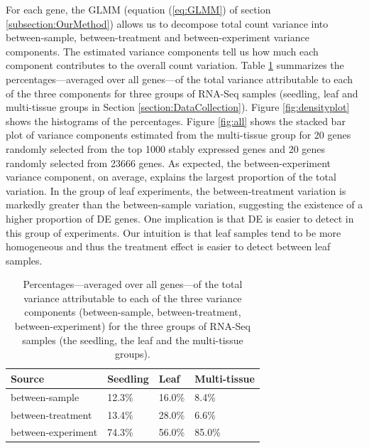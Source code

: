 \documentclass[letterpaper,12pt]{article}
\begin{document}
For each gene, the GLMM (equation (\ref{eq:GLMM}) of section
\ref{subsection:OurMethod}) allows us to decompose total count variance into
between-sample, between-treatment and between-experiment variance components.
The estimated variance components tell us how much each component contributes
to the overall count variation. Table \ref{table:percentageofvariation}
summarizes the percentages---averaged over all genes---of the total variance
attributable to each of the three components for three groups of RNA-Seq
samples (seedling, leaf and multi-tissue groups in Section \ref{section:DataCollection}). Figure \ref{fig:densityplot}
shows the histograms of the percentages. 
Figure \ref{fig:all} shows the stacked bar plot of variance components 
estimated from the multi-tissue group for 20
genes randomly selected from the top 1000 stably expressed genes 
and 20 genes randomly selected from 23666 genes. 
As expected, the between-experiment variance component, on average, explains
the largest proportion of the total variation. In the group of leaf
experiments, the between-treatment variation is markedly greater than the
between-sample variation, suggesting the existence of a higher proportion of DE genes.
One implication is that DE is easier to detect in
this group of experiments.  
Our intuition is that leaf samples tend
to be more homogeneous and thus the treatment effect is easier to detect
between leaf samples.

 
 \begin{center} 
     \begin{table}[!ht] 
	 \centering 
	 \caption{Percentages---averaged over all genes---of the total
	 variance attributable to each of the three variance components
	 (between-sample, between-treatment, between-experiment) for the three
	 groups of RNA-Seq samples (the seedling, the leaf and the
	 multi-tissue groups). %
	 } 
	 \label{table:percentageofvariation}

     \begin{tabular}{lp{3cm}p{2.5cm}p{3cm}}\hline
     Source & Seedling & Leaf & Multi-tissue \\  \hline
	 between-sample     & 12.3\%   & 16.0\% & 8.4\%           \\
	 between-treatment  & 13.4\%   & 28.0\% & 6.6\%           \\
	 between-experiment & 74.3\%   & 56.0\% & 85.0\%         \\ \hline
     \end{tabular} \end{table} \end{center}
\end{document}
